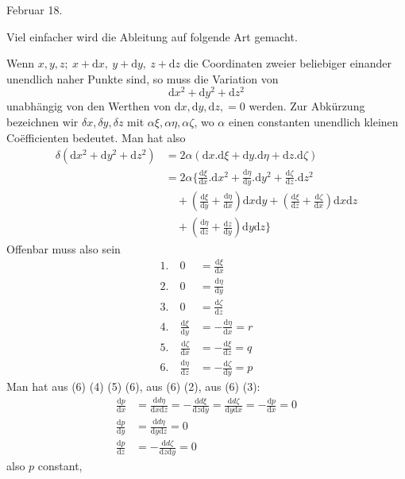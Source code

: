  Februar 18.

Viel einfacher wird die Ableitung auf folgende Art gemacht.

Wenn $x,y,z;\ x+\mathrm dx,\ y+\mathrm dy,\ z+\mathrm dz$ die Coordinaten zweier beliebiger einander unendlich naher Punkte sind, so muss die Variation von
\[
\mathrm dx^2+\mathrm dy^2+\mathrm dz^2
\]
unabhängig von den Werthen von $\mathrm dx,\mathrm dy,\mathrm dz,=0$ werden. Zur Abkürzung bezeichnen wir $\delta x,\delta y,\delta z$ mit $\alpha\xi,\alpha\eta,\alpha\zeta$, wo $\alpha$ einen constanten unendlich kleinen Coëfficienten bedeutet. Man hat also
\[
\begin{aligned}
\delta(\mathrm dx^2+\mathrm dy^2+\mathrm dz^2)&=2\alpha(\mathrm dx.\mathrm d\xi+\mathrm dy.\mathrm d\eta+\mathrm dz.\mathrm d\zeta)\\
&=2\alpha\Big\{\frac{\mathrm d\xi}{\mathrm dx}.\mathrm dx^2+\frac{\mathrm d\eta}{\mathrm dy}.\mathrm dy^2+\frac{\mathrm d\zeta}{\mathrm dz}.\mathrm dz^2\\
&\quad+\left(\frac{\mathrm d\xi}{\mathrm dy}+\frac{\mathrm d\eta}{\mathrm dx}\right)\mathrm dx\mathrm dy+\left(\frac{\mathrm d\xi}{\mathrm dz}+\frac{\mathrm d\zeta}{\mathrm dx}\right)\mathrm dx\mathrm dz\\
&\quad+\left(\frac{\mathrm d\eta}{\mathrm dz}+\frac{\mathrm dz}{\mathrm dy}\right)\mathrm dy\mathrm dz\Big\}
\end{aligned}
\]
Offenbar muss also sein
\[
\begin{aligned}
1.\quad0&=\frac{\mathrm d\xi}{\mathrm dx}\\
2.\quad0&=\frac{\mathrm d\eta}{\mathrm dy}\\
3.\quad0&=\frac{\mathrm d\zeta}{\mathrm dz}\\
4.\quad\frac{\mathrm d\xi}{\mathrm dy}&=-\frac{\mathrm d\eta}{\mathrm dx}=r\\
5.\quad\frac{\mathrm d\zeta}{\mathrm dx}&=-\frac{\mathrm d\xi}{\mathrm dz}=q\\
6.\quad\frac{\mathrm d\eta}{\mathrm dz}&=-\frac{\mathrm d\zeta}{\mathrm dy}=p
\end{aligned}
\]
Man hat aus (6) (4) (5) (6), aus (6) (2), aus (6) (3):
\[
\begin{aligned}
\frac{\mathrm dp}{\mathrm dx}&=\frac{\mathrm dd\eta}{\mathrm dx\mathrm dz}=-\frac{\mathrm dd\xi}{\mathrm dz\mathrm dy}=\frac{\mathrm dd\zeta}{\mathrm dy\mathrm dx}=-\frac{\mathrm dp}{\mathrm dx}=0\\
\frac{\mathrm dp}{\mathrm dy}&=\frac{\mathrm dd\eta}{\mathrm dy\mathrm dz}=0\\
\frac{\mathrm dp}{\mathrm dz}&=-\frac{\mathrm dd\zeta}{\mathrm dz\mathrm dy}=0
\end{aligned}
\]
also $p$ constant,

